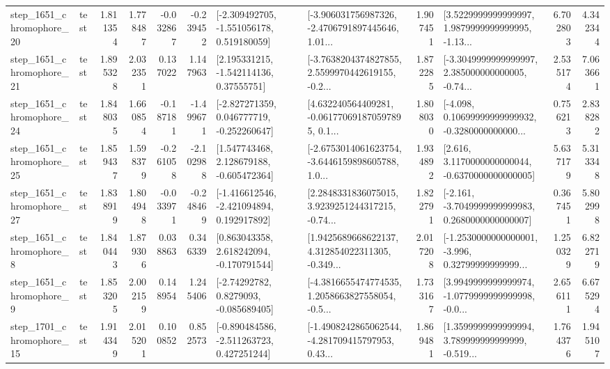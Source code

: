 \begin{tabular}{llrrrrllrlrr}
 step\_1651\_chromophore\_20 &      test &      1.811354 &    1.778487 &     -0.032867 & -0.239452 &   [-2.309492705, -1.551056178, 0.519180059] &  [-3.906031756987326, -2.4706791897445646, 1.01... &       1.907451 &  [3.5229999999999997, 1.9879999999999995, -1.13... &            6.702803 &          4.342344 \\
 step\_1651\_chromophore\_21 &      test &      1.895328 &    2.032351 &      0.137022 &  1.147963 &     [2.195331215, -1.542114136, 0.37555751] &  [-3.7638204374827855, 2.5599970442619155, -0.2... &       1.872285 &  [-3.3049999999999997, 2.385000000000005, -0.74... &            2.535174 &          7.063661 \\
 step\_1651\_chromophore\_24 &      test &      1.848035 &    1.660854 &     -0.187181 & -1.499671 &   [-2.827271359, 0.046777719, -0.252260647] &  [4.632240564409281, -0.061770691870597895, 0.1... &       1.808030 &  [-4.098, 0.10699999999999932, -0.3280000000000... &            0.756213 &          2.838282 \\
 step\_1651\_chromophore\_25 &      test &      1.859437 &    1.598379 &     -0.261058 & -2.102988 &    [1.547743468, 2.128679188, -0.605472364] &  [-2.6753014061623754, -3.6446159898605788, 1.0... &       1.934892 &   [2.616, 3.1170000000000044, -0.6370000000000005] &            5.637179 &          5.313348 \\
 step\_1651\_chromophore\_27 &      test &      1.838919 &    1.804948 &     -0.033971 & -0.248469 &   [-1.416612546, -2.421094894, 0.192917892] &  [2.2848331836075015, 3.9239251244317215, -0.74... &       1.822791 &  [-2.161, -3.7049999999999983, 0.2680000000000007] &            0.367451 &          5.802998 \\
  step\_1651\_chromophore\_8 &      test &      1.840443 &    1.879306 &      0.038863 &  0.346339 &    [0.863043358, 2.618242094, -0.170791544] &  [1.9425689668622137, 4.312854022311305, -0.349... &       2.017208 &  [-1.2530000000000001, -3.996, 0.32799999999999... &            1.250329 &          6.822719 \\
  step\_1651\_chromophore\_9 &      test &      1.853205 &    2.002159 &      0.148954 &  1.245406 &      [-2.74292782, 0.8279093, -0.085689405] &  [-4.3816655474774535, 1.2058663827558054, -0.5... &       1.733167 &  [3.9949999999999974, -1.0779999999999998, -0.0... &            2.656111 &          6.675294 \\
 step\_1701\_chromophore\_15 &      test &      1.914349 &    2.015201 &      0.100852 &  0.852573 &   [-0.890484586, -2.511263723, 0.427251244] &  [-1.4908242865062544, -4.281709415797953, 0.43... &       1.869481 &  [1.3599999999999994, 3.789999999999999, -0.519... &            1.764376 &          1.945107 \\

\end{tabular}
